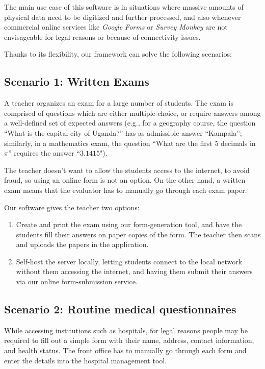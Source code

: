 \documentclass[11pt, a4paper]{report}
\begin{document}
The main use case of this software is in situations where massive amounts of physical data need to be digitized and further processed, and also whenever commercial online services like \textit{Google Forms} or \textit{Survey Monkey} are not envisageable for legal reasons or because of connectivity issues.

Thanks to its flexibility, our framework can solve the following scenarios:

\subsection*{Scenario 1: Written Exams}

A teacher organizes an exam for a large number of students.
The exam is comprised of questions which are either multiple-choice, or require answers among a well-defined set of expected answers (e.g., for a geography course, the question ``What is the capital city of Uganda?'' has as admissible answer ``Kampala''; similarly, in a mathematics exam, the question ``What are the first 5 decimals in $\pi$'' requires the answer ``$3.1415$").

The teacher doesn't want to allow the students access to the internet, to avoid fraud, so using an online form is not an option. On the other hand, a written exam means that the evaluator has to manually go through each exam paper.

Our software gives the teacher two options:
\begin{enumerate}
    \item Create and print the exam using our form-generation tool, and have the students fill their answers on paper copies of the form. The teacher then scans and uploads the papers in the application. 
    \item Self-host the server locally, letting students connect to the local network without them accessing the internet, and having them submit their answers via our online form-submission service.
\end{enumerate}

\subsection*{Scenario 2: Routine medical questionnaires}

While accessing institutions such as hospitals, for legal reasons people may be required to fill out a simple form with their name, address, contact information, and health status.
The front office has to manually go through each form and enter the details into the hospital management tool.
\end{document}
